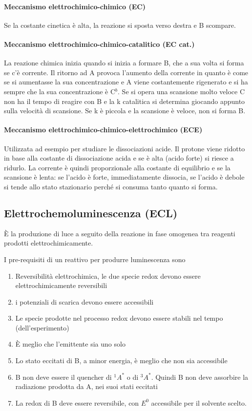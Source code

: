 \paragraph{Meccanismo elettrochimico-chimico (EC)}
Se la costante cinetica è alta, la reazione si sposta verso destra e B scompare.

\paragraph{Meccanismo elettrochimico-chimico-catalitico (EC cat.)}
La reazione chimica inizia quando si inizia a formare B, che a sua volta si forma se c’è corrente.
Il ritorno ad A provoca l'aumento della corrente in quanto è come se si aumentasse la sua concentrazione e A viene costantemente rigenerato e si ha sempre che la sua concentrazione è C$^b$.
Se si opera una scansione molto veloce C non ha il tempo di reagire con B e la k catalitica si determina giocando appunto sulla velocità di scansione.
Se k è piccola e la scansione è veloce, non si forma B.

\paragraph{Meccanismo elettrochimico-chimico-elettrochimico (ECE)}
Utilizzata ad esempio per studiare le dissociazioni acide.
Il protone viene ridotto in base alla costante di dissociazione acida e se è alta (acido forte) si riesce a ridurlo.
La corrente è quindi proporzionale alla costante di equilibrio e se la scansione è lenta: se l'acido è forte, immediatamente dissocia, se l'acido è debole si tende allo stato stazionario perché si consuma tanto quanto si forma.

\subsection{Elettrochemoluminescenza (ECL)}
È la produzione di luce a seguito della reazione in fase omogenea tra reagenti prodotti elettrochimicamente.

I pre-requisiti di un reattivo per produrre luminescenza sono
\begin{enumerate}
\item Reversibilità elettrochimica, le due specie redox devono essere elettrochimicamente reversibili
\item i potenziali di scarica devono essere accessibili
\item Le specie prodotte nel processo redox devono essere stabili nel tempo (dell'esperimento)
\item È meglio che l'emittente sia uno solo
\item Lo stato eccitati di B, a minor energia, è meglio che non sia accessibile
\item B non deve essere il quencher di $^1A^{\ast}$ o di $^3A^{\ast}$. Quindi B non deve assorbire la radiazione prodotta da A, nei suoi stati eccitati
\item La redox di B deve essere reversibile, con $E^0$ accessibile per il solvente scelto.
\end{enumerate}

